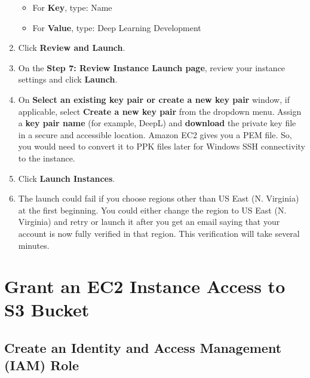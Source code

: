 \documentclass[]{book}
\providecommand{\tightlist}{%
  \setlength{\itemsep}{0pt}\setlength{\parskip}{0pt}}
\begin{document}
\begin{enumerate}
  \begin{itemize}
  \tightlist
  \item
    For \textbf{Key}, type: Name
  \item
    For \textbf{Value}, type: Deep Learning Development
  \end{itemize}
\item
  Click \textbf{Review and Launch}.
\item
  On the \textbf{Step 7: Review Instance Launch page}, review your instance settings and click \textbf{Launch}.
\item
  On \textbf{Select an existing key pair or create a new key pair} window, if applicable, select \textbf{Create a new key pair} from the dropdown menu. Assign a \textbf{key pair name} (for example, DeepL) and \textbf{download} the private key file in a secure and accessible location. Amazon EC2 gives you a PEM file. So, you would need to convert it to PPK files later for Windows SSH connectivity to the instance.\\
\item
  Click \textbf{Launch Instances}.
\item
  The launch could fail if you choose regions other than US East (N. Virginia) at the first beginning. You could either change the region to US East (N. Virginia) and retry or launch it after you get an email saying that your account is now fully verified in that region. This verification will take several minutes.
\end{enumerate}

\hypertarget{grant-an-ec2-instance-access-to-s3-bucket}{%
\chapter{Grant an EC2 Instance Access to S3 Bucket}\label{grant-an-ec2-instance-access-to-s3-bucket}}

\hypertarget{create-an-identity-and-access-management-iam-role}{%
\section{Create an Identity and Access Management (IAM) Role}\label{create-an-identity-and-access-management-iam-role}}
\end{document}
